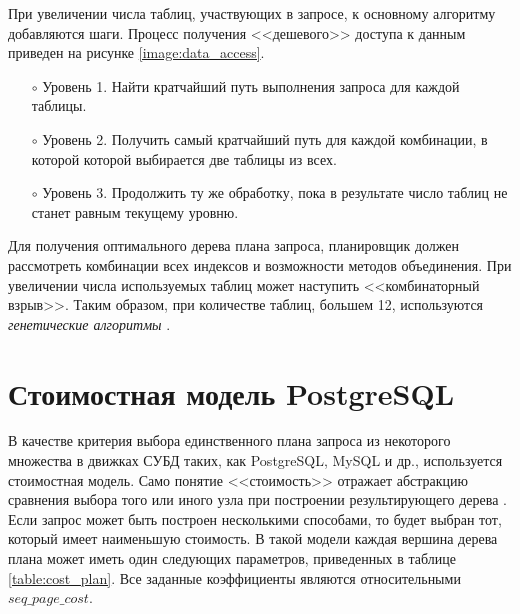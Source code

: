 При увеличении числа таблиц, участвующих в запросе, к основному алгоритму добавляются шаги. Процесс получения <<дешевого>> доступа к данным приведен на рисунке \ref{image:data_access}.
\begin{figure}[H]
	\captionsetup{justification=centering}
\end{figure}

\begin{itemize}
	\item[$\circ$] Уровень 1. Найти кратчайший путь выполнения запроса для каждой таблицы.\vspace{-0.2cm}
	\item[$\circ$] Уровень 2. Получить самый кратчайший путь для каждой комбинации, в которой которой выбирается две таблицы из всех.\vspace{-0.2cm}
	\item[$\circ$] Уровень 3. Продолжить ту же обработку, пока в результате число таблиц не станет равным текущему уровню.\vspace{-0.2cm}
\end{itemize}

Для получения оптимального дерева плана запроса, планировщик должен рассмотреть комбинации всех индексов и возможности методов объединения. При увеличении числа используемых таблиц может наступить <<комбинаторный взрыв>>. Таким образом, при количестве таблиц, большем 12, используются \textit{генетические алгоритмы} \cite{generetic_algorithm}.

\section{Стоимостная модель PostgreSQL}
\vspace{-0.5cm}
В качестве критерия выбора единственного плана запроса из некоторого множества в движках СУБД таких, как PostgreSQL, MySQL и др., используется стоимостная модель. Само понятие <<стоимость>> отражает абстракцию сравнения выбора того или иного узла при построении результирующего дерева  \cite{postgres_explain}. Если запрос может быть построен несколькими способами, то будет выбран тот, который имеет наименьшую стоимость. В такой модели каждая вершина дерева плана может иметь один следующих параметров, приведенных в таблице \ref{table:cost_plan}. Все заданные коэффициенты являются относительными $seq\_page\_cost$.

